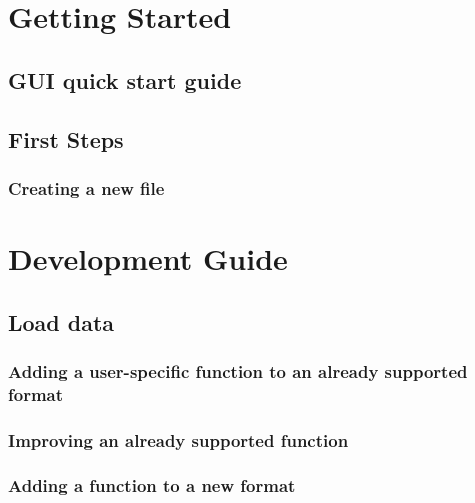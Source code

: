 \documentclass{book}
\begin{document}
\chapter{Getting Started}
    \section{GUI quick start guide}
        

    \section{First Steps}
        \subsection{Creating a new file}
            


\chapter{Development Guide} \label{chapter:dev_guide}
    

    \section{Load data} \label{sec:load_data}
        
        \subsection{Adding a user-specific function to an already supported format} \label{subsec:load_data.user_specific}
            
        \subsection{Improving an already supported function} \label{subsec:load_data.improvement}
            
        \subsection{Adding a function to a new format} \label{subsec:load_data.new_format}
            
            
\end{document}
